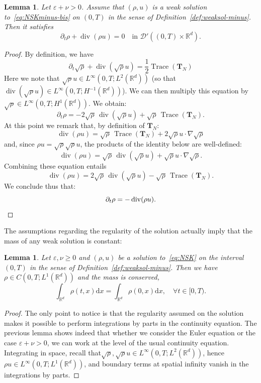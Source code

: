 \documentclass[10pt]{amsart}
\newtheorem{lemm}[theo]{Lemma}\newtheorem{prop}[theo]{Proposition}\newtheorem{coro}[theo]{Corollary}\newtheorem{conj}[theo]{Conjecture}
\theoremstyle{definition}\newtheorem{defi}[theo]{Definition}\newtheorem{rema}[theo]{Remark}\newtheorem{exam}[theo]{Example}\newtheorem{exem}[theo]{Example}\newtheorem{nota}[theo]{Notation}
\DeclareMathOperator{\DIV}{div}
\DeclareMathOperator{\Trace}{Trace}
\newcommand*\R{\mathbb{R}}
\newcommand*\dd {\mathrm{d}}
\newcommand*\<{\left\langle}
\renewcommand*\>{\right\rangle}
\renewcommand*\ge{\geqslant}
\newcommand*\eps{\varepsilon}
\let\oldforall\forall
\renewcommand*{\forall}{\mathrel{\oldforall}}
\begin{document}
\begin{lemm}\label{lem:continuite}
Let $\eps + \nu >0$. Assume that $(\rho,u)$ is a weak solution to~\eqref{eq:NSKminus-bis} on $(0,T)$ in the sense of Definition~\ref{def:weaksol-minus}. Then it satisfies
\[
\partial_t \rho + \DIV(\rho u) = 0 \quad \text{in \ $\mathcal D'((0,T) \times \mathbb R^d).$}
\]
\end{lemm}

\begin{proof}
By definition, we have
\[
\partial_t\sqrt{\rho}+\DIV\left(\sqrt{\rho} u\right)= \frac{1}{2}\Trace(\mathbf T_N)
\]
Here we note that $\sqrt{\rho}u \in L^{\infty}(0,T;L^{2}(\mathbb R^d))$ (so that $\DIV(\sqrt{\rho}u) \in L^{\infty}(0,T;H^{-1}(\mathbb R^d))$). We can then multiply this equation by $\sqrt{\rho} \in L^{\infty}(0,T;H^1(\mathbb R^d)).$ We obtain:
\[
\partial_t {\rho} = - 2\sqrt{\rho}\, \DIV(\sqrt{\rho}u) + \sqrt{\rho}\, \Trace(\mathbf T_N).
\]
At this point we remark that, by definition of $\mathbf T_N:$
\[
\DIV(\rho u) = \sqrt{\rho}\, \Trace(\mathbf T_N) + 2 \sqrt{\rho} u
\cdot \nabla \sqrt{\rho}
\]
and, since $\rho u = \sqrt{\rho} \sqrt{\rho} u$, the products of the identity below are well-defined:
\[
\DIV(\rho u) = \sqrt{\rho}\, \DIV(\sqrt{\rho}u) +
\sqrt{\rho} u \cdot \nabla \sqrt{\rho}.
\]
Combining these equation entails
\[
\DIV(\rho u) = 2\sqrt{\rho}\, \DIV(\sqrt{\rho} u) -
\sqrt{\rho}\, \Trace({\mathbf T}_N).
\]
We conclude thus that:
\[
\partial_t {\rho} = -\DIV(\rho u).\qedhere
\]
\end{proof}

The assumptions regarding the regularity of the solution actually imply that the mass of any weak solution is constant:

\begin{lemm}\label{lem:masse-conservee}
Let $\eps,\nu\ge 0$ and $(\rho,u)$ be a solution to~\eqref{eq:NSK} on the interval $(0,T)$ in the sense of Definition~\ref{def:weaksol-minus}. Then we have $\rho \in C(0,T;L^1(\R^d))$ and the mass is conserved,
\[
\int_{\R^d}\rho(t,x) \dd x=\int_{\R^d}\rho(0,x) \dd x,\quad \forall t\in [0,T).
\]
\end{lemm}

\begin{proof}
The only point to notice is that the regularity assumed on the solution makes it possible to perform integrations by parts in the continuity equation. The previous lemma shows indeed that whether we consider the Euler equation or the case $\eps+\nu>0$, we can work at the level of the usual continuity equation. Integrating in space, recall that$\sqrt\rho,\sqrt \rho u\in L^\infty(0,T;L^2(\R^d))$, hence $\rho u\in L^\infty(0,T;L^1(\R^d))$, and boundary terms at spatial infinity vanish in the integrations by parts.
\end{proof}
\end{document}
